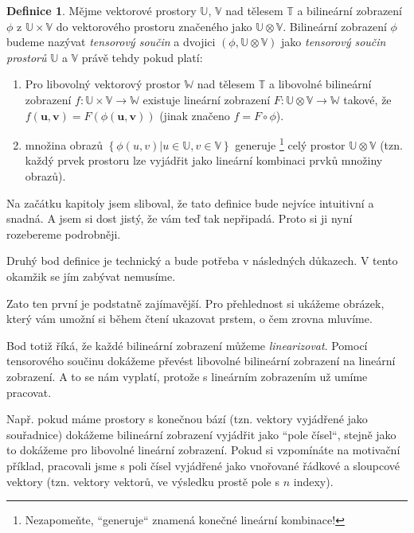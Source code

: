 \documentclass[a5paper,12pt]{amsbook}
\theoremstyle{definition}
\newtheorem{definition}{Definice}[chapter]
\newcommand{\myvec}[1]{\mathbf{#1}}
\newcommand{\myspace}[1]{\mathbb{#1}}
\begin{document}
\begin{definition}
\label{def:tensor_product_1}
Mějme vektorové prostory $\myspace{U}$, $\myspace{V}$ nad tělesem $\myspace{T}$ a bilineární zobrazení
$\phi$ z $\myspace{U}\times\myspace{V}$ do vektorového prostoru značeného jako
$\myspace{U}\otimes\myspace{V}$. Bilineární zobrazení $\phi$ budeme nazývat \textit{tensorový součin}
a dvojici $(\phi, \myspace{U}\otimes\myspace{V})$ jako \textit{tensorový součin prostorů} $\myspace{U}$
a $\myspace{V}$ právě tehdy pokud platí:
\begin{enumerate}	
\item Pro libovolný vektorový prostor $\myspace{W}$ nad tělesem $\myspace{T}$ a libovolné bilineární
    zobrazení $f: \myspace{U}\times\myspace{V}\rightarrow\myspace{W}$ existuje lineární zobrazení
    $F: \myspace{U}\otimes\myspace{V}\rightarrow\myspace{W}$ takové, že $f(\myvec{u}, \myvec{v})
    = F(\phi(\myvec{u}, \myvec{v}))$ (jinak značeno $f = F \circ \phi$).
\item množina obrazů $\left\lbrace\phi(u, v)|u\in\myspace{U}, v\in\myspace{V}\right\rbrace$ generuje
    \footnote{Nezapomeňte, ``generuje`` znamená konečné lineární kombinace!} celý prostor
    $\myspace{U}\otimes\myspace{V}$ (tzn. každý prvek prostoru lze vyjádřit jako lineární
    kombinaci prvků množiny obrazů).
\end{enumerate}
\end{definition}

Na začátku kapitoly jsem sliboval, že tato definice bude nejvíce intuitivní a snadná. A jsem si dost
jistý, že vám teď tak nepřipadá. Proto si ji nyní rozebereme podrobněji.

Druhý bod definice je technický a bude potřeba v následných důkazech. V tento okamžik
se jím zabývat nemusíme.

Zato ten první je podstatně zajímavější. Pro přehlednost si ukážeme obrázek, který vám umožní si během
čtení ukazovat prstem, o čem zrovna mluvíme.
\begin{center}

\end{center}

Bod totiž říká, že každé bilineární zobrazení můžeme \textit{linearizovat}. Pomocí tensorového
součinu dokážeme převést libovolné bilineární zobrazení na lineární zobrazení. A to se nám vyplatí,
protože s lineárním zobrazením už umíme pracovat.

Např. pokud máme prostory s konečnou bází (tzn. vektory vyjádřené jako souřadnice) dokážeme
bilineární zobrazení vyjádřit jako ``pole čísel``, stejně jako to dokážeme pro libovolné lineární
zobrazení. Pokud si vzpomínáte na motivační příklad, pracovali jsme s poli čísel vyjádřené jako
vnořované řádkové a sloupcové vektory (tzn. vektory vektorů, ve výsledku prostě pole s $n$ indexy).
\end{document}
